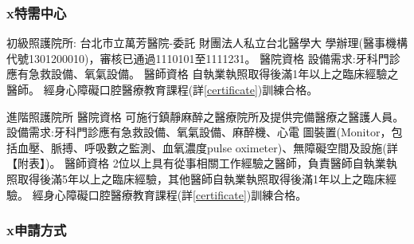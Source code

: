 \subsubsection{x特需中心}

\begin{outline}

\1 初級照護院所:
台北市立萬芳醫院-委託
財團法人私立台北醫學大
學辦理(醫事機構代號1301200010)，審核已通過1110101至1111231。
\2 醫院資格
    \3 設備需求:牙科門診應有急救設備、氧氣設備。
\2 醫師資格
    \3 %
    自執業執照取得後滿1年以上之臨床經驗之醫師。
    \3 經身心障礙口腔醫療教育課程(詳\ref{certificate})訓練合格。

\1 進階照護院所 %
\2 醫院資格
    \3 可施行鎮靜麻醉之醫療院所及提供完備醫療之醫護人員。
    \3 設備需求:牙科門診應有急救設備、氧氣設備、麻醉機、心電 圖裝置(Monitor，包括血壓、脈搏、呼吸數之監測、血氧濃度pulse oximeter)、無障礙空間及設施(詳【附表】)。
\2 醫師資格
    \3 2位以上具有從事相關工作經驗之醫師，負責醫師自執業執照取得後滿5年以上之臨床經驗，其他醫師自執業執照取得後滿1年以上之臨床經驗。
    \3 經身心障礙口腔醫療教育課程(詳\ref{certificate})訓練合格。
\end{outline}

\subsubsection{x申請方式}
